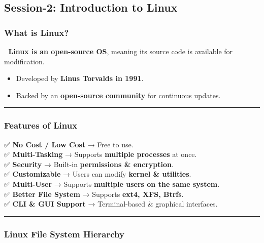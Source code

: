 \documentclass[
]{article}
\providecommand{\tightlist}{%
  \setlength{\itemsep}{0pt}\setlength{\parskip}{0pt}}
\begin{document}
\subsection{\texorpdfstring{\textbf{Session-2: Introduction to
Linux}}{Session-2: Introduction to Linux}}\label{session-2-introduction-to-linux}

\subsubsection{\texorpdfstring{\textbf{What is
Linux?}}{What is Linux?}}\label{what-is-linux}

📌 \textbf{Linux is an open-source OS}, meaning its source code is
available for modification.

\begin{itemize}
\tightlist
\item
  Developed by \textbf{Linus Torvalds in 1991}.
\item
  Backed by an \textbf{open-source community} for continuous updates.
\end{itemize}

\begin{center}\rule{0.5\linewidth}{0.5pt}\end{center}

\subsubsection{\texorpdfstring{\textbf{Features of
Linux}}{Features of Linux}}\label{features-of-linux}

✅ \textbf{No Cost / Low Cost} → Free to use.\\
✅ \textbf{Multi-Tasking} → Supports \textbf{multiple processes} at
once.\\
✅ \textbf{Security} → Built-in \textbf{permissions \& encryption}.\\
✅ \textbf{Customizable} → Users can modify \textbf{kernel \&
utilities}.\\
✅ \textbf{Multi-User} → Supports \textbf{multiple users on the same
system}.\\
✅ \textbf{Better File System} → Supports \textbf{ext4, XFS, Btrfs}.\\
✅ \textbf{CLI \& GUI Support} → Terminal-based \& graphical interfaces.

\begin{center}\rule{0.5\linewidth}{0.5pt}\end{center}

\subsubsection{\texorpdfstring{\textbf{Linux File System
Hierarchy}}{Linux File System Hierarchy}}\label{linux-file-system-hierarchy}
\end{document}
